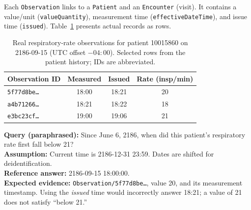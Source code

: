 \documentclass[sigconf,nonacm]{acmart}
\begin{document}
Each \texttt{Observation} links to a \texttt{Patient} and an \texttt{Encounter} (visit). It contains a value/unit (\texttt{valueQuantity}), measurement time (\texttt{effectiveDateTime}), and issue time (\texttt{issued}). Table~\ref{tab:example} presents actual records as rows.

\begin{table}[!t]
\caption{Real respiratory-rate observations for patient 10015860 on 2186-09-15 (UTC offset $-04{:}00$). Selected rows from the patient history; IDs are abbreviated.}
\label{tab:example}
\centering
\small
\setlength{\tabcolsep}{4pt}
\begin{tabular}{@{}lccc@{}}
\toprule
Observation ID & Measured & Issued & Rate (insp/min) \\
\midrule
\texttt{5f77d8be\ldots} & 18:00 & 18:21 & 20 \\
\texttt{a4b71266\ldots} & 18:21 & 18:22 & 18 \\
\texttt{e3bc23cf\ldots} & 19:00 & 19:06 & 21 \\
\bottomrule
\end{tabular}
\par\smallskip
\begin{minipage}{\columnwidth}
\small
\textbf{Query (paraphrased):} Since June 6, 2186, when did this patient's respiratory rate first fall below 21?\\
\textbf{Assumption:} Current time is 2186-12-31 23:59. Dates are shifted for deidentification.\\
\textbf{Reference answer:} 2186-09-15 18:00:00.\\
\textbf{Expected evidence:} \texttt{Observation/5f77d8be\ldots}, value 20, and its measurement timestamp. Using the \emph{issued} time would incorrectly answer 18:21; a value of 21 does not satisfy ``below 21.''
\end{minipage}
\end{table}
\end{document}
